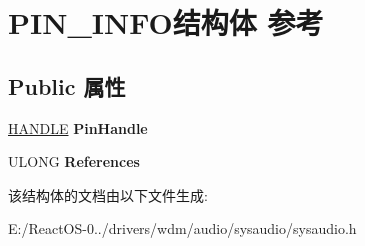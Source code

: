 \hypertarget{struct_p_i_n___i_n_f_o}{}\section{P\+I\+N\+\_\+\+I\+N\+F\+O结构体 参考}
\label{struct_p_i_n___i_n_f_o}
\subsection*{Public 属性}
\begin{DoxyCompactItemize}
\item 
\mbox{\label{struct_p_i_n___i_n_f_o_ae603cb0305aaf91ab19adb9ee8ea6b1f}} 
\hyperlink{interfacevoid}{H\+A\+N\+D\+LE} {\bfseries Pin\+Handle}
\item 
\mbox{\label{struct_p_i_n___i_n_f_o_a50a1e22013da1b5855361160d9cf5b8c}} 
U\+L\+O\+NG {\bfseries References}
\end{DoxyCompactItemize}


该结构体的文档由以下文件生成\+:\begin{DoxyCompactItemize}
\item 
E\+:/\+React\+O\+S-\/0../drivers/wdm/audio/sysaudio/sysaudio.\+h\end{DoxyCompactItemize}
